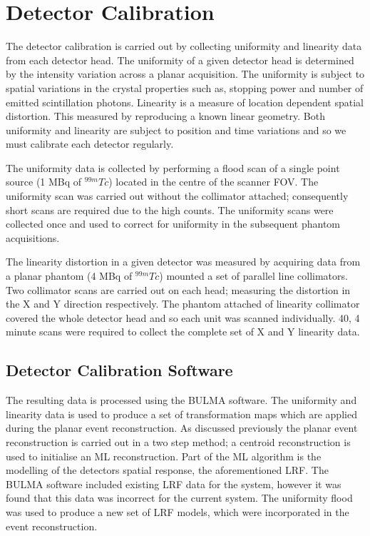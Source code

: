 \section{Detector Calibration}
The detector calibration is carried out by collecting uniformity and linearity data from each detector head. The uniformity of a given detector head is determined by the intensity variation across a planar acquisition. The uniformity is subject to spatial variations in the crystal properties such as, stopping power and number of emitted scintillation photons. Linearity is a measure of location dependent spatial distortion. This measured by reproducing a known linear geometry. Both uniformity and linearity are subject to position and time variations and so we must calibrate each detector regularly.

The uniformity data is collected by performing a flood scan of a single point source (1 MBq of $^{99m}Tc$) located in the centre of the scanner \acrshort{FOV}. The uniformity scan was carried out without the collimator attached; consequently short scans are required due to the high counts. The uniformity scans were collected once and used to correct for uniformity in the subsequent phantom acquisitions. 

The linearity distortion in a given detector was measured by acquiring data from a planar phantom (4 MBq of $^{99m}Tc$) mounted a set of parallel line collimators. Two collimator scans are carried out on each head; measuring the distortion in the X and Y direction respectively. The phantom attached of linearity collimator covered the whole detector head and so each unit was scanned individually. 40, 4 minute scans were required to collect the complete set of X and Y linearity data. 

\subsection{Detector Calibration Software}
The resulting data is processed using the BULMA software. The uniformity and linearity data is used to produce a set of transformation maps which are applied during the planar event reconstruction. As discussed previously the planar event reconstruction is carried out in a two step method; a centroid reconstruction is used to initialise an \acrshort{ML} reconstruction. Part of the \acrshort{ML} algorithm is the modelling of the detectors spatial response, the aforementioned \acrshort{LRF}. The BULMA software included existing \acrshort{LRF} data for the system, however it was found that this data was incorrect for the current system. The uniformity flood was used to produce a new set of \acrshort{LRF} models, which were incorporated in the event reconstruction.

